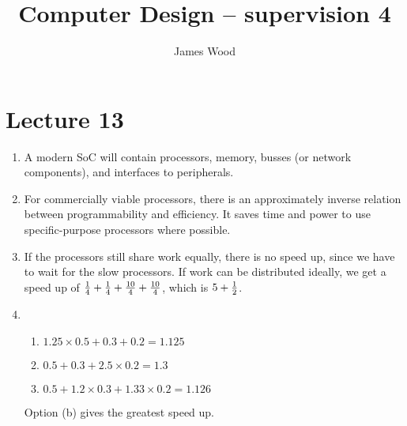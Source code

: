 \documentclass{article}
\begin{document}
\title{Computer Design -- supervision 4}
\author{James Wood}
\maketitle

\section{Lecture 13}
\begin{enumerate}
  \item A modern SoC will contain processors, memory, busses (or network components), and interfaces to peripherals.
  \item For commercially viable processors, there is an approximately inverse relation between programmability and efficiency. It saves time and power to use specific-purpose processors where possible.
\setcounter{enumi}{4}
  \item If the processors still share work equally, there is no speed up, since we have to wait for the slow processors. If work can be distributed ideally, we get a speed up of ${1 \over 4} + {1 \over 4} + {10 \over 4} + {10 \over 4}$, which is $5+{1 \over 2}$.
  \item
    \begin{enumerate}
      \item $1.25 \times 0.5 + 0.3 + 0.2 = 1.125$
      \item $0.5 + 0.3 + 2.5 \times 0.2 = 1.3$
      \item $0.5 + 1.2 \times 0.3 + 1.33 \times 0.2 = 1.126$
    \end{enumerate}
    Option (b) gives the greatest speed up.
\end{enumerate}
\end{document}
